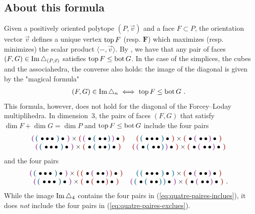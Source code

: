 \documentclass[twoside, 12pt]{amsart}
\theoremstyle{remark}
\begin{document}
\subsection{About this formula} 
\label{ss:about}

Given a positively oriented polytope $(P, \vec v)$ and a face $F \subset P$, the orientation vector $\vec v$ defines a unique vertex $\operatorname{top} F$ (resp. $\bm F$) which maximizes (resp. minimizes) the scalar product $\langle - , \vec v \rangle$. 
By \cite[Proposition 1.15]{LA21}, we have that any pair of faces $(F,G) \in \operatorname{Im} \triangle_{(P,\vec v)}$ satisfies $\operatorname{top} F \leq \operatorname{bot} G$. 
In the case of the simplices, the cubes and the associahedra, the converse also holds: the image of the diagonal is given by the "magical formula" 
\begin{align}
\label{eq:magical-formula}
(F,G) \in \operatorname{Im} \triangle_n \iff \operatorname{top} F\leq \operatorname{bot} G \ . 
\end{align}
This formula, however, does not hold for the diagonal of the Forcey--Loday multiplihedra. 
In dimension~$3$, the pairs of faces $(F,G)$ that satisfy $\dim F + \dim G = \dim P$ and $\operatorname{top} F\leq \operatorname{bot} G$ include the four pairs 
\begin{equation} \label{eq:quatre-paires-inclues}
\begin{matrix}
\purple{\blue{\bullet \bullet \bullet}\bullet} \times \red{\purple{\bullet\blue{\bullet\bullet}}\bullet} & 
\red{\blue{\bullet\bullet\bullet}\bullet} \times \red{\bullet\purple{\bullet\bullet}\bullet}  \\
\purple{\blue{\bullet\bullet\bullet}\bullet} \times \red{\bullet\blue{\bullet\bullet}\bullet} &
\red{\purple{\bullet\blue{\bullet\bullet}}\bullet} \times \red{\bullet\purple{\bullet\bullet}\bullet}  
\end{matrix}
\end{equation}
and the four pairs
\begin{equation} \label{eq:quatre-paires-exclues}
\begin{matrix}
\purple{\blue{\bullet \bullet \bullet}\bullet} \times \red{\red{\bullet\purple{\bullet\bullet}}\bullet} & 
\blue{\blue{\bullet\bullet\bullet}\bullet} \times \red{\bullet\purple{\bullet\bullet}\bullet}  \\
\purple{\blue{\bullet\bullet\bullet}\bullet} \times \red{\bullet\red{\bullet\bullet}\bullet} &
\purple{\blue{\bullet\blue{\bullet\bullet}}\bullet} \times \red{\bullet\purple{\bullet\bullet}\bullet}  \ .
\end{matrix}
\end{equation}
While the image $\operatorname{Im} \triangle_4$ contains the four pairs in (\ref{eq:quatre-paires-inclues}), it does \emph{not} include the four pairs in (\ref{eq:quatre-paires-exclues}).
\end{document}
